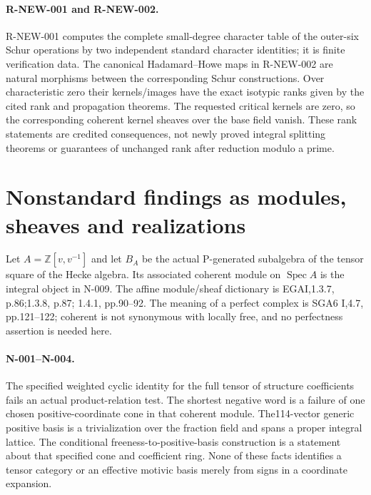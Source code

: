 \paragraph{R-NEW-001 and R-NEW-002.}
R-NEW-001 computes the complete small-degree character table
of the outer-six Schur operations by two independent standard
character identities; it is finite verification data.
The canonical Hadamard--Howe maps in R-NEW-002 are natural
morphisms between the corresponding Schur constructions.
Over characteristic zero their kernels/images have the exact
isotypic ranks given by the cited rank and propagation
theorems.  The requested critical kernels are zero, so the
corresponding coherent kernel sheaves over the base field
vanish.  These rank statements are credited consequences,
not newly proved integral splitting theorems or guarantees
of unchanged rank after reduction modulo a prime.

\section{Nonstandard findings as modules, sheaves and realizations}

Let $A=\mathbb Z[v,v^{-1}]$ and let $B_A$ be the actual
P-generated subalgebra of the tensor square of the Hecke
algebra.  Its associated coherent module on $\operatorname{Spec}A$
is the integral object in N-009.  The affine module/sheaf
dictionary is EGAI,1.3.7, p.86;1.3.8, p.87;
1.4.1, pp.90--92.  The meaning of a perfect complex is
SGA6 I,4.7, pp.121--122; coherent is not synonymous with
locally free, and no perfectness assertion is needed here.

\paragraph{N-001--N-004.}
The specified weighted cyclic identity for the full tensor of
structure coefficients fails an actual product-relation test.
The shortest negative word is a failure of one
chosen positive-coordinate cone in that coherent module.
The114-vector generic positive basis is a trivialization
over the fraction field and spans a proper integral lattice.
The conditional freeness-to-positive-basis construction is
a statement about that specified cone and coefficient ring.
None of these facts identifies a tensor category or an
effective motivic basis merely from signs in a coordinate
expansion.

